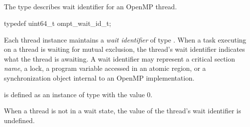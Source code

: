 \subsection{}
\label{sec:ompt_wait_id_t}

\summary
The  type describes wait identifier for an OpenMP thread.

\format
\begin{ccppspecific}
\begin{omptOther}
typedef uint64_t ompt_wait_id_t;
\end{omptOther}
\end{ccppspecific}

\descr

Each thread instance maintains a \emph{wait identifier} of type 
. When a task executing on a thread is waiting 
for mutual exclusion, the thread's wait identifier indicates what the 
thread is awaiting. A wait identifier may represent a critical section 
{\em name}, a lock, a program variable accessed in an atomic region, or 
a synchronization object internal to an OpenMP implementation.

 is defined as an instance of type 
 with the value 0.

When a thread is not in a wait state, the value of the thread's wait 
identifier is undefined.

